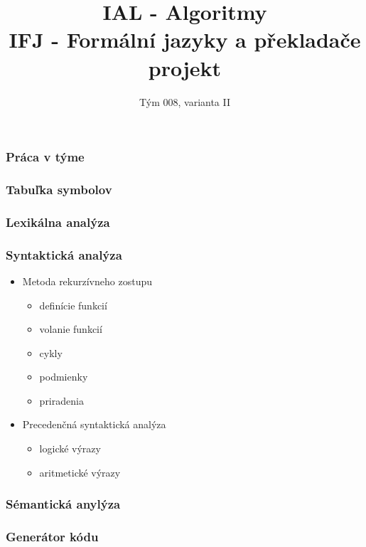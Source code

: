 \documentclass[usenames,dvipsnames]{beamer}
\title{IAL - Algoritmy \\
IFJ - Formální jazyky a překladače \\
projekt}
\subtitle{Tým 008, varianta II}
\date{}
\begin{document}
\begin{frame}
\maketitle
\begin{table}[H]
	\Large
	\centering
\end{table}
\end{frame}

\begin{frame}
	\frametitle{Práca v týme}
\end{frame}

\begin{frame}
	\frametitle{Tabuľka symbolov}
\end{frame}

\begin{frame}
	\frametitle{Lexikálna analýza}

\end{frame}
%	
\begin{frame}
	\frametitle{Syntaktická analýza}
	\begin{itemize}
		\item{Metoda rekurzívneho zostupu}
			\begin{itemize}
				\item definície funkcií
			 	\item volanie funkcií
				\item cykly
				\item podmienky
				\item priradenia
			\end{itemize}
		\item{Precedenčná syntaktická analýza}
		\begin{itemize}
			\item logické výrazy
			\item aritmetické výrazy
		\end{itemize}
	\end{itemize}

\end{frame}
%
\begin{frame}
	\frametitle{Sémantická anylýza}

\end{frame}
%
\begin{frame}
	\frametitle{Generátor kódu}

\end{frame}
\end{document}
